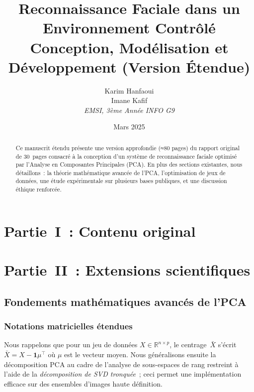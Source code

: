\documentclass[12pt,a4paper]{report}
\title{Reconnaissance Faciale dans un Environnement Contrôlé\\\large Conception, Modélisation et Développement (Version Étendue)}
\author{Karim Hanfaoui\\Imane Kafif\\\textit{EMSI, 3ème Année INFO G9}}
\date{Mars 2025}
\newcommand{\pca}{\textsc{PCA}}
\begin{document}
\maketitle
{}
\begin{abstract}
Ce manuscrit étendu présente une version approfondie (≈80 pages) du rapport original de 30 pages consacré à la conception d'un système de reconnaissance faciale optimisé par l'Analyse en Composantes Principales (\pca). En plus des sections existantes, nous détaillons : la théorie mathématique avancée de l'\pca, l'optimisation de jeux de données, une étude expérimentale sur plusieurs bases publiques, et une discussion éthique renforcée.\end{abstract}
\tableofcontents
\cleardoublepage
{}

\part*{Partie I : Contenu original}

\part*{Partie II : Extensions scientifiques}

\chapter{Fondements mathématiques avancés de l'\pca}
\section{Notations matricielles étendues}
Nous rappelons que pour un jeu de données $X\in \mathbb R^{n\times p}$, le centrage $\bar X$ s'écrit $\bar X=X-\mathbf 1\mu^\top$ où $\mu$ est le vecteur moyen.  Nous généralisons ensuite la décomposition \pca{} au cadre de l'analyse de sous-espaces de rang restreint à l'aide de la \emph{décomposition de SVD tronquée} ; ceci permet une implémentation efficace sur des ensembles d'images haute définition.
\end{document}
